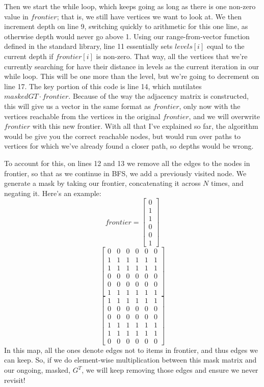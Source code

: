 Then we start the while loop, which keeps going as long as there is one non-zero value in $frontier$; that is, we still have vertices we want to look at.  We then increment depth on line 9, switching quickly to arithmetic for this one line, as otherwise depth would never go above 1.  Using our range-from-vector function defined in the standard library, line 11 essentially sets $levels[i]$ equal to the current depth if $frontier[i]$ is non-zero.  That way, all the vertices that we're currently searching for have their distance in levels as the current iteration in our while loop.  This will be one more than the level, but we're going to decrement on line 17.   The key portion of this code is line 14, which mutilates $maskedGT\cdot frontier$.  Because of the way the adjacency matrix is constructed, this will give us a vector in the same format as $frontier$, only now with the vertices reachable from the vertices in the original $frontier$, and we will overwrite $frontier$ with this new frontier.  With all that I've explained so far, the algorithm would be give you the correct reachable nodes, but would run over paths to vertices for which we've already found a closer path, so depths would be wrong.

To account for this, on lines 12 and 13 we remove all the edges to the nodes in frontier, so that as we continue in BFS, we add a previously visited node.  We generate a mask by taking our frontier, concatenating it across $N$ times, and negating it.  Here's an example:
$$frontier = \begin{bmatrix}0 \\1\\1\\0\\0\\1\end{bmatrix}$$
$$\begin{bmatrix}
0&0&0&0&0&0\\
1&1&1&1&1&1\\
1&1&1&1&1&1\\
0&0&0&0&0&0\\
0&0&0&0&0&0\\
1&1&1&1&1&1
\end{bmatrix}$$
$$\begin{bmatrix}
1&1&1&1&1&1\\
0&0&0&0&0&0\\
0&0&0&0&0&0\\
1&1&1&1&1&1\\
1&1&1&1&1&1\\
0&0&0&0&0&0
\end{bmatrix}$$
In this map, all the ones denote edges not to items in frontier, and thus edges we can keep.  So, if we do element-wise multiplication between this mask matrix and our ongoing, masked, $G^T$, we will keep removing those edges and ensure we never revisit!
